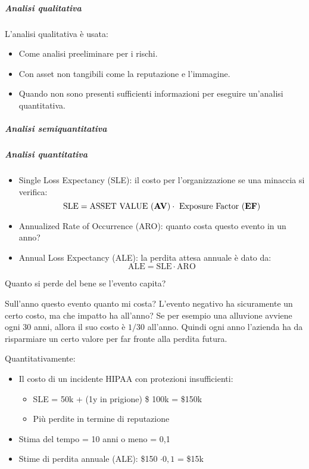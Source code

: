\subparagraph*{Analisi qualitativa}

L'analisi qualitativa è usata:
\begin{itemize}
\item Come analisi preeliminare per i rischi.
\item Con asset non tangibili come la reputazione e l'immagine.
\item Quando non sono presenti sufficienti informazioni per eseguire un'analisi quantitativa.
\end{itemize}



\subparagraph*{Analisi semiquantitativa}



\subparagraph*{Analisi quantitativa}

\begin{itemize}
\item Single Loss Expectancy (SLE): il costo per l'organizzazione se una
minaccia si verifica:
$$
\text{SLE} = \text{ASSET VALUE (\textbf{AV})} \cdot \text{ Exposure Factor (\textbf{EF})}
$$
\item Annualized Rate of Occurrence (ARO): quanto costa questo evento in un
anno?
\item Annual Loss Expectancy (ALE): la perdita attesa annuale è dato da: 
$$
\text{ALE} = \text{SLE} \cdot \text{ARO}
$$
\end{itemize}


Quanto si perde del bene se l'evento capita?

Sull'anno questo evento quanto mi costa? L'evento negativo ha sicuramente un
certo costo, ma che impatto ha all'anno? Se per esempio una alluvione avviene
ogni 30 anni, allora il suo costo è $1/30$ all'anno. Quindi ogni anno l'azienda
ha da risparmiare un certo valore per far fronte alla perdita futura.



Quantitativamente:
\begin{itemize}
\item Il costo di un incidente HIPAA con protezioni insufficienti:
\begin{itemize}
 \item SLE = 50k + (1y in prigione) \$ 100k = \$150k
 \item Più perdite in termine di reputazione
\end{itemize}
\item Stima del tempo = 10 anni o meno = 0,1
\item Stime di perdita annuale (ALE): \$150 $\cdot 0,1$ = \$15k
\end{itemize}


